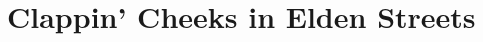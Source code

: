 \chapter{Clappin' Cheeks in Elden Streets}

\newcommand\ITutorialBoss{1}
\newcommand\ITutorial{
    \the\numexpr
    \ITutorialBoss
    \relax
}

\newcommand\ILimgraveSentinel{19}
\newcommand\ILimgraveMonsters{3}
\newcommand\ILimgrave{
    \the\numexpr
    \ILimgraveSentinel +
    \ILimgraveMonsters
    \relax
}

\newcommand\IStormhillMobs{1}
\newcommand\IStormhillMargit{14}
\newcommand\IStormhill{
    \the\numexpr
    \IStormhillMobs +
    \IStormhillMargit
    \relax
}

\newcommand\ITableMobs{4}
\newcommand\ITable{
    \the\numexpr
    \ITableMobs
    \relax
}

\newcommand\IEnvDeaths{
    \the\numexpr
    0
    \relax
}
\newcommand\IMobDeaths{
    \the\numexpr
    \ILimgraveMonsters +
    \IStormhillMobs +
    \ITableMobs
    \relax
}
\newcommand\IBossDeaths{
    \the\numexpr
    \ITutorialBoss +
    \ILimgraveSentinel +
    \IStormhillMargit
    \relax
}
\newcommand\IDeaths{
    \the\numexpr
    \IEnvDeaths +
    \IMobDeaths +
    \IBossDeaths
    \relax
}

